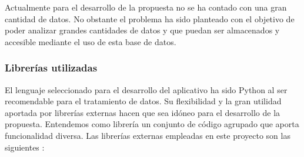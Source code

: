Actualmente para el desarrollo de la propuesta no se ha contado con una gran cantidad 
de datos. No obstante el problema ha sido planteado con el objetivo de poder analizar 
grandes cantidades de datos y que puedan ser almacenados y accesible mediante el 
uso de esta base de datos.

\subsubsection{Librerías utilizadas} \label{subsection: LibreriasExternas}
El lenguaje seleccionado para el desarrollo del aplicativo ha sido Python al ser 
recomendable para el tratamiento de datos. Su flexibilidad y la gran utilidad aportada 
por librerías externas hacen que sea idóneo para el desarrollo de la propuesta. 
Entendemos como librería un conjunto de código agrupado que aporta funcionalidad 
diversa. Las librerías externas empleadas en este proyecto son las siguientes :
